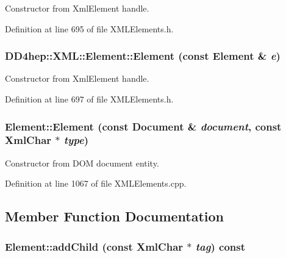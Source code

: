 Constructor from XmlElement handle. 

Definition at line 695 of file XMLElements.h.\hypertarget{class_d_d4hep_1_1_x_m_l_1_1_element_abc4154273029baf538d1f9b68e6196a6}{
\subsubsection[{Element}]{\setlength{\rightskip}{0pt plus 5cm}DD4hep::XML::Element::Element (const {\bf Element} \& {\em e})}}
\label{class_d_d4hep_1_1_x_m_l_1_1_element_abc4154273029baf538d1f9b68e6196a6}


Constructor from XmlElement handle. 

Definition at line 697 of file XMLElements.h.\hypertarget{class_d_d4hep_1_1_x_m_l_1_1_element_a9f3edfe23e1514d285b10a20932875e7}{
\subsubsection[{Element}]{\setlength{\rightskip}{0pt plus 5cm}Element::Element (const {\bf Document} \& {\em document}, \/  const {\bf XmlChar} $\ast$ {\em type})}}
\label{class_d_d4hep_1_1_x_m_l_1_1_element_a9f3edfe23e1514d285b10a20932875e7}


Constructor from DOM document entity. 

Definition at line 1067 of file XMLElements.cpp.

\subsection{Member Function Documentation}
\hypertarget{class_d_d4hep_1_1_x_m_l_1_1_element_afe39653d6adf8052df90dc8fcccd71b1}{
\subsubsection[{addChild}]{ Element::addChild (const {\bf XmlChar} $\ast$ {\em tag}) const}}
\label{class_d_d4hep_1_1_x_m_l_1_1_element_afe39653d6adf8052df90dc8fcccd71b1}


